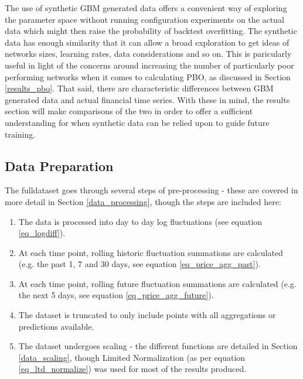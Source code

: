 \documentclass[a4paper,11pt,oneside]{article}
\theoremstyle{plain}
\theoremstyle{definition}
\begin{document}
	The use of synthetic GBM generated data offers a convenient way of exploring the parameter space without running configuration experiments on the actual data which might then raise the probability of backtest overfitting. The synthetic data has enough similarity that it can allow a broad exploration to get ideas of networks sizes, learning rates, data considerations and so on. This is paricularly useful in light of the concerns around increasing the number of particularly poor performing networks when it comes to calculating PBO, as discussed in Section \ref{results_pbo}. That said, there are characteristic differences between GBM generated data and actual financial time series. With these in mind, the results section will make comparisons of the two in order to offer a sufficient understanding for when synthetic data can be relied upon to guide future training.
	
	\subsection{Data Preparation}\label{proc_dataprep}
	
	The fulldataset goes through several steps of pre-processing - these are covered in more detail in Section \ref{data_processing}, though the steps are included here:
	
	\begin{enumerate}
		\item The data is processed into day to day log fluctuations (see equation \eqref{eq_logdiff}).
		\item At each time point, rolling historic fluctuation summations are calculated (e.g. the past 1, 7 and 30 days, see equation \eqref{eq_price_agg_past}).
		\item At each time point, rolling future fluctuation summations are calculated (e.g. the next 5 days, see equation \eqref{eq_price_agg_future}).
		\item The dataset is truncated to only include points with all aggregations or predictions available.
		\item The dataset undergoes scaling - the different functions are detailed in Section \ref{data_scaling}, though Limited Normalization (as per equation \eqref{eq_ltd_normalize}) was used for most of the results produced.
	\end{enumerate}
	
\end{document}
